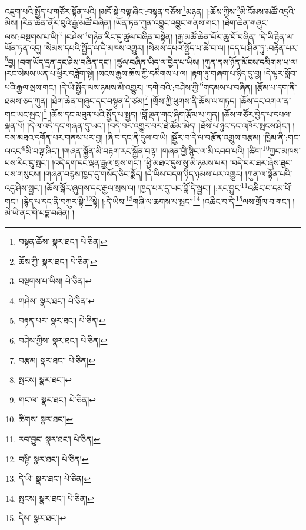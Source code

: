 འཇུག་པའི་སྤྱོད་པ་གཙོར་སྟོན་པའི། །མདོ་སྡེ་བལྟ་ཞིང་:བསྟན་བཅོས་\footnote{བསྟན་ཆོས་  སྣར་ཐང་།  པེ་ཅིན། }མཉན། །:ཆོས་ཀྱིས་\footnote{ཆོས་ཀྱི་  སྣར་ཐང་།  པེ་ཅིན། }མི་ངོམས་མཚོ་འདྲའི་མིས། །རིན་ཆེན་ནོར་བུའི་རྒྱ་མཚོ་བཞིན། །ཡོན་ཏན་ཀུན་འབྱུང་འབྱུང་གནས་གང་། །ཐེག་ཆེན་གཞུང་ལས་:བསྔགས་པ་ཡི།\footnote{བསྔགས་པ་ཡིས།  པེ་ཅིན། } །བཤེས་\footnote{གཤེས་  སྣར་ཐང་།  པེ་ཅིན། }གཉེན་རིང་དུ་ཚུལ་བཞིན་བསྟེན། །རྒྱ་མཚོ་ཆེན་པོར་ཆུ་བོ་བཞིན། །དེ་ཡི་རྟེན་ལ་ཡོན་ཏན་འདུ། །སེམས་དཔའི་སྤྱོད་ལ་དེ་མཁས་འགྱུར། །སེམས་དཔའ་སྤྱོད་པ་ཆེ་བ་ལ། །དད་པ་ཤིན་ཏུ་:བརྟེན་པར་\footnote{བརྟན་པར་  སྣར་ཐང་།  པེ་ཅིན། }བྱ། །བག་ཡོད་དྲན་དང་ཤེས་བཞིན་དང་། །ཚུལ་བཞིན་ཡིད་ལ་བྱེད་པ་ཡིས། །ཀུན་ནས་ཉོན་མོངས་དམིགས་པ་ལ། །རང་སེམས་ཡན་པ་ཕྱིར་བཟློག་སྟེ། །སངས་རྒྱས་ཆོས་ཀྱི་དམིགས་པ་ལ། །རྟག་ཏུ་གཞག་པ་ཉིད་དུ་བྱ། །དེ་ལྟར་སློབ་པའི་རྒྱལ་སྲས་གང་། །དེ་ཡི་སྤྱོད་ལས་ཉམས་མི་འགྱུར། །དགེ་བའི་:བཤེས་ཀྱི་\footnote{བཤེས་ཀྱིས་  སྣར་ཐང་།  པེ་ཅིན། }གདམས་པ་བཞིན། །རྩོམ་པ་དག་ནི་ཐམས་ཅད་ཀུན། །ཐེག་ཆེན་གཞུང་དང་བསྟུན་དེ་ཙམ།\footnote{བརྩམ།  སྣར་ཐང་།  པེ་ཅིན། } །གྲོས་ཀྱི་ཕུགས་ནི་ཆོས་ལ་གཏད། །ཆོས་དང་འགལ་ན་གང་ཡང་སྤང་།\footnote{སྤངས།  སྣར་ཐང་། } །ཆོས་དང་མཐུན་པའི་སྤྱོད་པ་སྤྱད། །བློ་ལྡན་གང་ཞིག་རྩོམ་པ་ཀུན། །ཆོས་གཙོར་བྱེད་པ་དཔལ་ལྡན་པོ། །དེ་ལ་འདི་དང་གཞན་དུ་ཡང་། །བདེ་བར་འགྱུར་བར་ཐེ་ཚོམ་མེད། །ཐོས་པ་ཉུང་དང་འཁོར་སྤངས་ཤིང་། །བས་མཐའ་དགོན་པར་གནས་པར་བྱ། །ཞི་བ་དང་ནི་དུལ་བ་ཡི། །སྦྱོར་བ་དེ་ལ་བརྩོན་འགྲུས་བརྩམ། །ཁྱིམ་ནི་:གང་ལའང་\footnote{གང་ལ་  སྣར་ཐང་།  པེ་ཅིན། }མི་བལྟ་ཞིང་། །གཞན་སྐྱོན་མི་བརྟག་རང་སྐྱོན་བལྟ། །གཞན་གྱི་སྙིང་ལ་མི་འབབ་པའི། །ཚིག་\footnote{ཚིགས་  སྣར་ཐང་། }ཀྱང་མཁས་པས་རིང་དུ་སྤང་། །འདི་དག་དང་ལྡན་རྒྱལ་སྲས་གང་། །ཕྱི་མཐའ་དུས་སུ་མི་ཉམས་པར། །བདེ་བར་ཐར་ཞེས་ཐུབ་པས་གསུངས། །གཞན་བརྙས་ཁྱད་དུ་གསོད་ཅིང་སྨོད། །དེ་ཡིས་བདག་ཉིད་ཉམས་པར་འགྱུར། །ཀུན་ལ་སྟོན་པའི་འདུ་ཤེས་སྦྱང་། །ཆོས་སྒོར་ཞུགས་དང་རྒྱལ་སྲས་ལ། །ཁྱད་པར་དུ་ཡང་བློ་དེ་སྦྱང་། །:རང་བྱུང་\footnote{རབ་བྱུང་  སྣར་ཐང་།  པེ་ཅིན། }འཆིང་བ་དམ་པོ་གང་། །རྙེད་པ་དང་ནི་བཀུར་སྟི་\footnote{བསྟི་  སྣར་ཐང་།  པེ་ཅིན། }སྟེ། །:དེ་ཡིས་\footnote{དེ་ཡི་  སྣར་ཐང་།  པེ་ཅིན། }གཞི་ལ་ཆགས་པ་སྤང་།\footnote{སྤངས།  སྣར་ཐང་།  པེ་ཅིན། } །འཆིང་བ་དེ་\footnote{དེས་  སྣར་ཐང་། }ལས་གྲོལ་བ་གང་། །མེ་ཡི་ནང་གི་པདྨ་བཞིན། །
